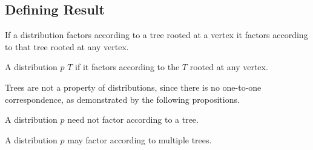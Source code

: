 \subsection{Defining Result}
\begin{prop}
If a distribution factors according
to a tree rooted at a vertex it
factors according to that tree rooted
at any vertex.
\end{prop}


A distribution $p$
 $T$
if it factors according to the
$T$ rooted at any vertex.


Trees are not a property of distributions,
since there is no one-to-one correspondence,
as demonstrated by the following propositions.


A distribution $p$ need not factor according to a tree.

A distribution
$p$ may factor according to multiple trees.
\strats
